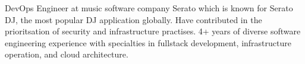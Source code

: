 

\begin{cvparagraph}

DevOps Engineer at music software company Serato which is known for Serato DJ, the most popular DJ application globally.
Have contributed in the prioritsation of security and infrastructure practises. 4+ years of diverse software
engineering experience with specialties in fullstack development, infrastructure operation, and cloud architecture.
\end{cvparagraph}
